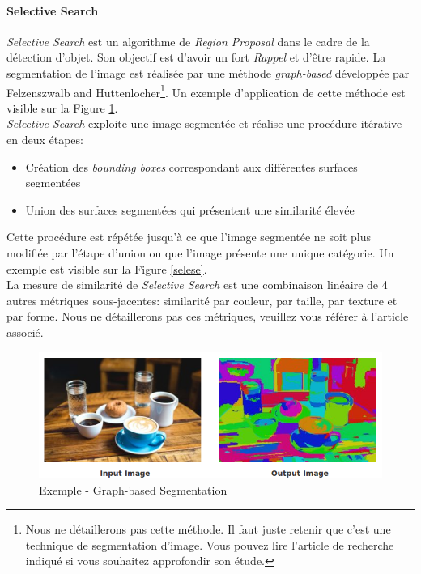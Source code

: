 \paragraph{Selective Search}

\textit{Selective Search} est un algorithme de \textit{Region Proposal} dans le cadre de la détection d'objet. Son objectif est d'avoir un fort \textit{Rappel} et d'être rapide. La segmentation de l'image est réalisée par une méthode \textit{graph-based} développée par Felzenszwalb and Huttenlocher\cite{segss}\footnote{Nous ne détaillerons pas cette méthode. Il faut juste retenir que c'est une technique de segmentation d'image. Vous pouvez lire l'article de recherche indiqué si vous souhaitez approfondir son étude.}. Un exemple d'application de cette méthode est visible sur la Figure \ref{segssim}.\\

\noindent \textit{Selective Search} exploite une image segmentée et réalise une procédure itérative en deux étapes:
\begin{itemize}
    \item Création des \textit{bounding boxes} correspondant aux différentes surfaces segmentées
    \item Union des surfaces segmentées qui présentent une similarité élevée
\end{itemize}

\noindent Cette procédure est répétée jusqu'à ce que l'image segmentée ne soit plus modifiée par l'étape d'union ou que l'image présente une unique catégorie. Un exemple est visible sur la Figure \ref{selese}.\\

\noindent La mesure de similarité de \textit{Selective Search} est une combinaison linéaire de 4 autres métriques sous-jacentes: similarité par couleur, par taille, par texture et par forme. Nous ne détaillerons pas ces métriques, veuillez vous référer à l'article associé.

\begin{figure}
    \centering
    \includegraphics[scale=0.4]{./tex/computer-vision/object-recognition/segss.png}
    \caption{Exemple - Graph-based Segmentation}
    \label{segssim}
\end{figure}

